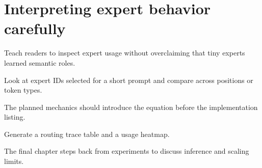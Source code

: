 \section{Interpreting expert behavior carefully}
\label{sec:ch11-interpreting-expert-behavior-carefully}

Teach readers to inspect expert usage without overclaiming that tiny experts learned semantic roles.



Look at expert IDs selected for a short prompt and compare across positions or token types.



The planned mechanics should introduce the equation before the implementation listing.





\begin{checkpointbox}
Generate a routing trace table and a usage heatmap.
\end{checkpointbox}

The final chapter steps back from experiments to discuss inference and scaling limits.
